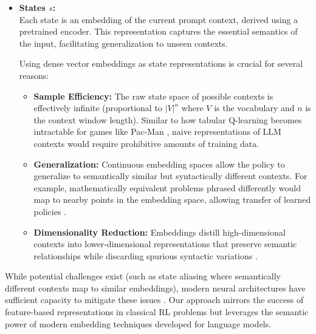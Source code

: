 \documentclass[10pt,journal,compsoc]{IEEEtran}
\begin{document}
\begin{itemize}
\item
  \textbf{States \(s\):}\\
  Each state is an embedding of the current prompt context, derived
  using a pretrained encoder. This representation captures the essential
  semantics of the input, facilitating generalization to unseen
  contexts. 
  
  Using dense vector embeddings as state representations is crucial for several reasons:
  \begin{itemize}
    \item \textbf{Sample Efficiency:} The raw state space of possible contexts is effectively infinite (proportional to $|V|^n$ where $V$ is the vocabulary and $n$ is the context window length). Similar to how tabular Q-learning becomes intractable for games like Pac-Man \citep{mnih2013playing}, naive representations of LLM contexts would require prohibitive amounts of training data.
    
    \item \textbf{Generalization:} Continuous embedding spaces allow the policy to generalize to semantically similar but syntactically different contexts. For example, mathematically equivalent problems phrased differently would map to nearby points in the embedding space, allowing transfer of learned policies \citep{bengio2013representation}.
    
    \item \textbf{Dimensionality Reduction:} Embeddings distill high-dimensional contexts into lower-dimensional representations that preserve semantic relationships while discarding spurious syntactic variations \citep{mikolov2013distributed}.
  \end{itemize}
\end{itemize}
  
While potential challenges exist (such as state aliasing where semantically different contexts map to similar embeddings), modern neural architectures have sufficient capacity to mitigate these issues \citep{arora2019theoretical}. Our approach mirrors the success of feature-based representations in classical RL problems \citep{sutton2018reinforcement} but leverages the semantic power of modern embedding techniques developed for language models.
\end{document}
